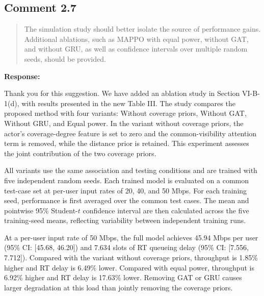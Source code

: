 \documentclass[11pt,a4paper]{article}
\newcommand{\qrev}[1]{{\color{qinrev}#1}}
\begin{document}

\subsection*{Comment 2.7}

\begin{quote}\small The simulation study should better isolate the source of performance gains. Additional ablations, such as MAPPO with equal power, without GAT, and without GRU, as well as confidence intervals over multiple random seeds, should be provided.\end{quote}

\textbf{Response:}\par

Thank you for this suggestion. We have added an ablation study in \qrev{Section VI-B-1(d)}, with results presented in the new Table III. The study compares the proposed method with four variants: Without coverage priors, Without GAT, Without GRU, and Equal power. In the variant without coverage priors, the actor's coverage-degree feature is set to zero and the common-visibility attention term is removed, while the distance prior is retained. This experiment assesses the joint contribution of the two coverage priors.
\par

All variants use the same association and testing conditions and are trained with five independent random seeds. Each trained model is evaluated on a common test-case set at per-user input rates of 20, 40, and 50 Mbps. For each training seed, performance is first averaged over the common test cases. The mean and pointwise 95\% Student-$t$ confidence interval are then calculated across the five training-seed means, reflecting variability between independent training runs.
\par

At a per-user input rate of 50 Mbps, the full model achieves 45.94 Mbps per user (95\% CI: [45.68, 46.20]) and 7.634 slots of RT queueing delay (95\% CI: [7.556, 7.712]). Compared with the variant without coverage priors, throughput is 1.85\% higher and RT delay is 6.49\% lower. Compared with equal power, throughput is 6.92\% higher and RT delay is 17.63\% lower. Removing GAT or GRU causes larger degradation at this load than jointly removing the coverage priors.
\par
\end{document}
